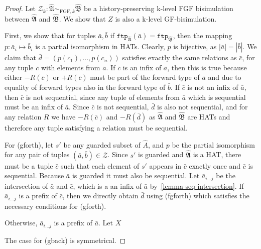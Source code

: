 \documentclass[draft]{scrartcl}
\theoremstyle{definition}
\begin{document}
\begin{proof}
Let $\mathcal{Z}_k: \mathfrak{\hat{A}} \sim_{\textrm{FGF},k} \mathfrak{\hat{B}}$ be a history-preserving k-level FGF bisimulation between $\mathfrak{\hat{A}}$ and $\mathfrak{\hat{B}}$. We show that $Z$ is also a k-level GF-bisimulation.

First, we show that for tuples $\bar{a}, \bar{b}$ if $\mathtt{ftp}_\mathfrak{\hat{A}}(\bar{a}) = \mathtt{ftp}_\mathfrak{\hat{B}}$, then the mapping $p: \bar{a}_i \mapsto \bar{b}_i$ is a partial isomorphism in HATs.
Clearly, $p$ is bijective, as $|\bar{a}| = |\bar{b}|$.
We claim that $\bar{d} = (p(c_1), ..., p(c_n))$ satisfies exactly the same relations as $\bar{c}$, for any tuple $\bar{c}$ with elements from $\bar{a}$.
If $\bar{c}$ is an infix of $\bar{a}$, then this is true because either $-R(\bar{c})$ or $+R(\bar{c})$ must be part of the forward type of $\bar{a}$ and due to equality of forward types also in the forward type of $\bar{b}$.
If $\bar{c}$ is not an infix of $\bar{a}$, then $\bar{c}$ is not sequential, since any tuple of elements from $\bar{a}$ which is sequential must be an infix of $\bar{a}$.
Since $\bar{c}$ is not sequential, $\bar{d}$ is also not sequential, and for any relation $R$ we have $-R(\bar{c})$ and $-R(\bar{d})$ as $\mathfrak{\hat{A}}$ and $\mathfrak{\hat{B}}$ are HATs and therefore any tuple satisfying a relation must be sequential.

For (gforth), let $s'$ be any guarded subset of $\hat{A}$, and $p$ be the partial isomorphism for any pair of tuples $(\bar{a},\bar{b}) \in \mathcal{Z}$.
Since $s'$ is guarded and $\mathfrak{\hat{A}}$ is a HAT, there must be a tuple $\bar{c}$ such that each element of $s'$ appears in $\bar{c}$ exactly once and $\bar{c}$ is sequential.
Because $\bar{a}$ is guarded it must also be sequential.
Let $\bar{a}_{i\ldots{}j}$ be the intersection of $\bar{a}$ and $\bar{c}$, which is a an infix of $\bar{a}$ by~\cref{lemma-seq-intersection}.
If $\bar{a}_{i\ldots{}j}$ is a prefix of $\bar{c}$, then we directly obtain $\bar{d}$ using (fgforth) which satisfies the necessary conditions for (gforth).

Otherwise, $\bar{a}_{i\ldots{}j}$ is a prefix of $\bar{a}$.
Let $X_{}$


The case for (gback) is symmetrical.

\end{proof}
\end{document}

